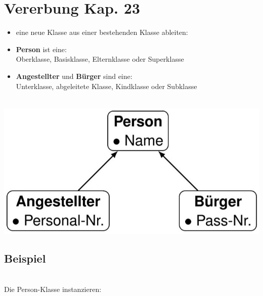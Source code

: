 \section[Vererbung]{Vererbung \tiny{Kap. 23}}

\begin{minipage}[t]{0.64\textwidth}
	\begin{itemize}
		\item eine neue Klasse aus einer bestehenden Klasse ableiten:
		\item \textbf{Person} ist eine:\\
		Oberklasse, Basisklasse, Elternklasse oder Superklasse
		\item \textbf{Angestellter} und \textbf{Bürger} sind eine:\\
		Unterklasse, abgeleitete Klasse, Kindklasse oder Subklasse
	\end{itemize}
\end{minipage}
\hspace{0.02\textwidth}
\begin{minipage}[t]{0.34\textwidth}
	$\quad$\\
	\includegraphics[width=\textwidth]{images/v7_vererbung1}
\end{minipage}





\begin{minipage}[t]{0.49\textwidth}
	\subsection{Beispiel}
	
\end{minipage}
\hspace{0.02\textwidth}
\begin{minipage}[t]{0.49\textwidth}
	$\quad$\\
	Die Person-Klasse instanzieren:
	
\end{minipage}\\[12pt]

